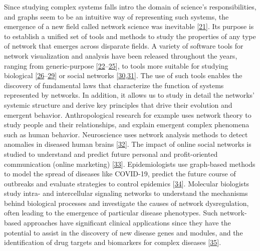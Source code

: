 \documentclass[
  12pt,
]{book}
\begin{document}
Since studying complex systems falls intro the domain of science's responsibilities, and graphs seem to be an intuitive way of representing such systems, the emergence of a new field called network science was inevitable {[}\protect\hyperlink{ref-Barabasi2013}{21}{]}.
Its purpose is to establish a unified set of tools and methods to study the properties of any type of network that emerges across disparate fields.
A variety of software tools for network visualization and analysis have been released throughout the years, ranging from generic-purpose {[}\protect\hyperlink{ref-Csardi2006}{22}--\protect\hyperlink{ref-Shannon2003}{25}{]}, to tools more suitable for studying biological {[}\protect\hyperlink{ref-Dahlquist2002}{26}--\protect\hyperlink{ref-Sidiropoulos2017}{29}{]} or social networks {[}\protect\hyperlink{ref-Smith2009}{30},\protect\hyperlink{ref-Kalamaras2014}{31}{]}.
The use of such tools enables the discovery of fundamental laws that characterize the function of systems represented by networks.
In addition, it allows us to study in detail the networks' systemic structure and derive key principles that drive their evolution and emergent behavior.
Anthropological research for example uses network theory to study people and their relationships, and explain emergent complex phenomena such as human behavior.
Neuroscience uses network analysis methods to detect anomalies in diseased human brains {[}\protect\hyperlink{ref-Chatterjee2021}{32}{]}.
The impact of online social networks is studied to understand and predict future personal and profit-oriented communication (online marketing) {[}\protect\hyperlink{ref-Mislove2007}{33}{]}.
Epidemiologists use graph-based methods to model the spread of diseases like COVID-19, predict the future course of outbreaks and evaluate strategies to control epidemics {[}\protect\hyperlink{ref-Maheshwari2020}{34}{]}.
Molecular biologists study intra- and intercellular signaling networks to understand the mechanisms behind biological processes and investigate the causes of network dysregulation, often leading to the emergence of particular disease phenotypes.
Such network-based approaches have significant clinical applications since they have the potential to assist in the discovery of new disease genes and modules, and the identification of drug targets and biomarkers for complex diseases {[}\protect\hyperlink{ref-Barabasi2011}{35}{]}.
\end{document}
